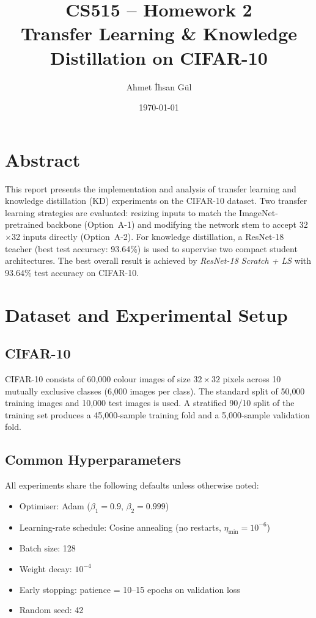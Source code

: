 \documentclass[12pt,a4paper]{article}
\title{\textbf{CS515 -- Homework 2}\\[6pt]
        \large Transfer Learning \& Knowledge Distillation on CIFAR-10}
\author{Ahmet İhsan Gül}
\date{\today}
\begin{document}
\maketitle
\tableofcontents
\newpage

\section*{Abstract}

This report presents the implementation and analysis of transfer learning and knowledge distillation (KD) experiments on the CIFAR-10 dataset. Two transfer learning strategies are evaluated: resizing inputs to match the ImageNet-pretrained backbone (Option~A-1) and modifying the network stem to accept 32$\times$32 inputs directly (Option~A-2). For knowledge distillation, a ResNet-18 teacher (best test accuracy: 93.64\%) is used to supervise two compact student architectures. The best overall result is achieved by \textit{ResNet-18 Scratch + LS} with 93.64\% test accuracy on CIFAR-10.

\newpage


\section{Dataset and Experimental Setup}

\subsection{CIFAR-10}
CIFAR-10 consists of 60{,}000 colour images of size $32\times32$ pixels across
10 mutually exclusive classes (6{,}000 images per class). The standard split of
50{,}000 training images and 10{,}000 test images is used. A stratified
90/10 split of the training set produces a 45{,}000-sample training fold and a
5{,}000-sample validation fold.

\subsection{Common Hyperparameters}
All experiments share the following defaults unless otherwise noted:
\begin{itemize}
  \item Optimiser: Adam ($\beta_1{=}0.9$, $\beta_2{=}0.999$)
  \item Learning-rate schedule: Cosine annealing (no restarts, $\eta_{\min}{=}10^{-6}$)
  \item Batch size: 128
  \item Weight decay: $10^{-4}$
  \item Early stopping: patience = 10--15 epochs on validation loss
  \item Random seed: 42
\end{itemize}
\end{document}
